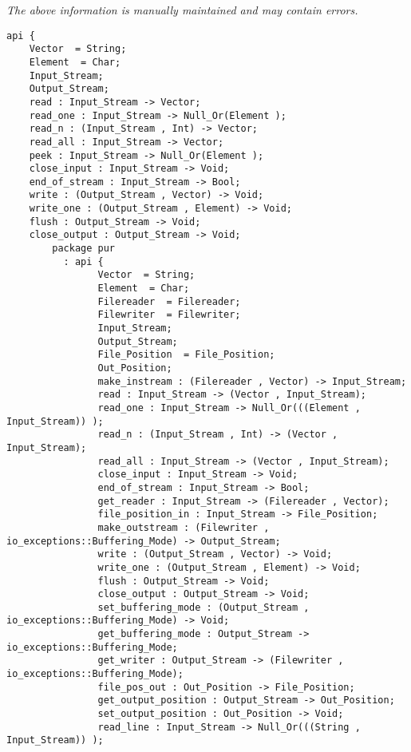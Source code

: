 \label{api:Winix\_Text\_File\_For\_Os}

{\tiny \it The above information is manually maintained and may contain errors.}
\begin{verbatim}
api {
    Vector  = String;
    Element  = Char;
    Input_Stream;
    Output_Stream;
    read : Input_Stream -> Vector;
    read_one : Input_Stream -> Null_Or(Element );
    read_n : (Input_Stream , Int) -> Vector;
    read_all : Input_Stream -> Vector;
    peek : Input_Stream -> Null_Or(Element );
    close_input : Input_Stream -> Void;
    end_of_stream : Input_Stream -> Bool;
    write : (Output_Stream , Vector) -> Void;
    write_one : (Output_Stream , Element) -> Void;
    flush : Output_Stream -> Void;
    close_output : Output_Stream -> Void;
        package pur
          : api {
                Vector  = String;
                Element  = Char;
                Filereader  = Filereader;
                Filewriter  = Filewriter;
                Input_Stream;
                Output_Stream;
                File_Position  = File_Position;
                Out_Position;
                make_instream : (Filereader , Vector) -> Input_Stream;
                read : Input_Stream -> (Vector , Input_Stream);
                read_one : Input_Stream -> Null_Or(((Element , Input_Stream)) );
                read_n : (Input_Stream , Int) -> (Vector , Input_Stream);
                read_all : Input_Stream -> (Vector , Input_Stream);
                close_input : Input_Stream -> Void;
                end_of_stream : Input_Stream -> Bool;
                get_reader : Input_Stream -> (Filereader , Vector);
                file_position_in : Input_Stream -> File_Position;
                make_outstream : (Filewriter , io_exceptions::Buffering_Mode) -> Output_Stream;
                write : (Output_Stream , Vector) -> Void;
                write_one : (Output_Stream , Element) -> Void;
                flush : Output_Stream -> Void;
                close_output : Output_Stream -> Void;
                set_buffering_mode : (Output_Stream , io_exceptions::Buffering_Mode) -> Void;
                get_buffering_mode : Output_Stream -> io_exceptions::Buffering_Mode;
                get_writer : Output_Stream -> (Filewriter , io_exceptions::Buffering_Mode);
                file_pos_out : Out_Position -> File_Position;
                get_output_position : Output_Stream -> Out_Position;
                set_output_position : Out_Position -> Void;
                read_line : Input_Stream -> Null_Or(((String , Input_Stream)) );

\end{verbatim}
